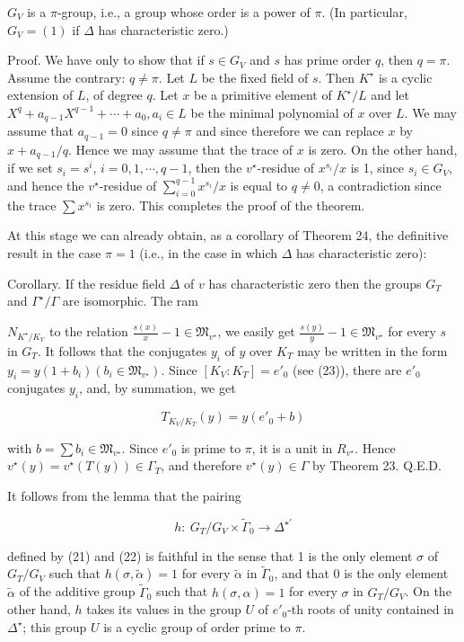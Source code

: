 $G_V$ is a $\pi$-group, i.e., a group whose order is a power of $\pi$. (In particular, $G_V = (1)$ if $\Delta$ has characteristic zero.)

Proof. We have only to show that if $s \in G_V$ and $s$ has prime order $q$, then $q = \pi$. Assume the contrary: $q \neq \pi$. Let $L$ be the fixed field of $s$. Then $K^\star$ is a cyclic extension of $L$, of degree $q$. Let $x$ be a primitive element of $K^\star/L$ and let $X^q + a_{q-1}X^{q-1} + \cdots + a_0, a_i \in L$ be the minimal polynomial of $x$ over $L$. We may assume that $a_{q-1} = 0$ since $q \neq \pi$ and since therefore we can replace $x$ by $x + a_{q-1}/q$. Hence we may assume that the trace of $x$ is zero. On the other hand, if we set $s_i = s^i$, $i = 0, 1, \cdots, q-1$, then the $v^\star$-residue of $x^{s_i}/x$ is 1, since $s_i \in G_V$, and hence the $v^\star$-residue of $\sum_{i=0}^{q-1} x^{s_i}/x$ is equal to $q \neq 0$, a contradiction since the trace $\sum x^{s_i}$ is zero. This completes the proof of the theorem.

At this stage we can already obtain, as a corollary of Theorem 24, the definitive result in the case $\pi = 1$ (i.e., in the case in which $\Delta$ has characteristic zero):

Corollary. If the residue field $\Delta$ of $v$ has characteristic zero then the groups $G_T$ and $\Gamma^\star/\Gamma$ are isomorphic. The ram

$N_{K^\star/K_V}$ to the relation $\frac{s(x)}{x} - 1 \in \mathfrak{M}_{v^\star}$, we easily get $\frac{s(y)}{y} - 1 \in \mathfrak{M}_{v^\star}$ for every $s$ in $G_T$. It follows that the conjugates $y_i$ of $y$ over $K_T$ may be written in the form $y_i = y(1 + b_i)(b_i \in \mathfrak{M}_{v^\star})$. Since $[K_V:K_T] = e'_0$ (see (23)), there are $e'_0$ conjugates $y_i$, and, by summation, we get

$$T_{K_V/K_T}(y) = y(e'_0 + b)$$

with $b = \sum b_i \in \mathfrak{M}_{v^\star}$. Since $e'_0$ is prime to $\pi$, it is a unit in $R_{v^\star}$. Hence $v^\star(y) = v^\star(T(y)) \in \Gamma_T$, and therefore $v^\star(y) \in \Gamma$ by Theorem 23. Q.E.D.

It follows from the lemma that the pairing

$$h: \ G_T/G_V \times \tilde{\Gamma}_0 \rightarrow \Delta^{\star'}$$

defined by (21) and (22) is faithful in the sense that 1 is the only element $\sigma$ of $G_T/G_V$ such that $h(\sigma, \tilde{\alpha}) = 1$ for every $\tilde{\alpha}$ in $\tilde{\Gamma}_0$, and that 0 is the only element $\tilde{\alpha}$ of the additive group $\tilde{\Gamma}_0$ such that $h(\sigma, \alpha) = 1$ for every $\sigma$ in $G_T/G_V$. On the other hand, $h$ takes its values in the group $U$ of $e'_0$-th roots of unity contained in $\Delta^\star$; this group $U$ is a cyclic group of order prime to $\pi$.


